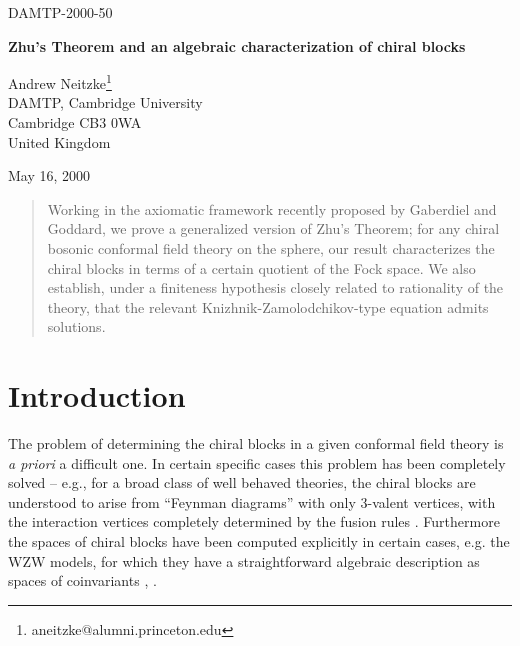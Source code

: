 \documentclass[a4paper,12pt]{article}
\newcommand{\ti}[1]{\textit{#1}}
\begin{document}
\begin{flushright}
  DAMTP-2000-50
\end{flushright}

\begin{center} \LARGE{\textbf{Zhu's Theorem and an algebraic characterization of chiral blocks}} \end{center}
\vskip 1.0cm
\begin{center}{\large Andrew Neitzke\footnote{aneitzke@alumni.princeton.edu}\\
DAMTP, Cambridge University\\
Cambridge CB3 0WA\\
United Kingdom\\}\end{center}

\begin{center} May 16, 2000 \end{center}

\vskip 0.8cm


\begin{abstract}

Working in the axiomatic framework recently proposed by Gaberdiel and Goddard, we prove a generalized version
of Zhu's Theorem; for any chiral bosonic conformal field theory on the sphere, our result characterizes 
the chiral blocks in terms of a certain quotient of the Fock space.  We also establish,
under a finiteness hypothesis closely related to rationality of the theory, that the
relevant Knizhnik-Zamolodchikov-type equation admits solutions.

\end{abstract}


\section{Introduction} \label{intro}

The problem of determining the chiral blocks in a given 
conformal field theory is \ti{a priori} a difficult one.  In certain 
specific cases this problem has been
completely solved -- e.g., for a broad class of well behaved theories, the chiral blocks
are understood to arise from ``Feynman diagrams'' with only $3$-valent vertices, with the
interaction vertices completely determined by the
fusion rules \cite{DFMS}.  Furthermore the spaces of chiral blocks have been computed explicitly
in certain cases, e.g. the WZW models, for which they have a straightforward
algebraic description as spaces of coinvariants \cite{FSV}, \cite{KL}.  
\end{document}

